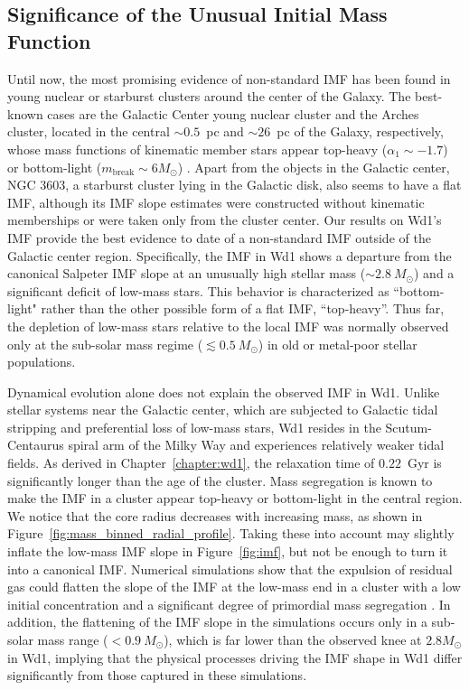\documentclass[12pt]{ucsddissertation}
\begin{document}
\begin{CJK*}{UTF8}{gbsn}
\section{Significance of the Unusual Initial Mass Function}
Until now, the most promising evidence of non-standard IMF has been found in young nuclear or starburst clusters around the center of the Galaxy. The best-known cases are the Galactic Center young nuclear cluster and the Arches cluster, located in the central $\sim0.5$~pc and $\sim26$~pc of the Galaxy, respectively, whose mass functions of kinematic member stars appear top-heavy ($\alpha_1\sim-1.7$) or bottom-light ($m_\mathrm{break}\sim6M_\odot$) \citep[][]{Hosek-2019}. 
Apart from the objects in the Galactic center, NGC 3603, a starburst cluster lying in the Galactic disk, also seems to have a flat IMF, although its IMF slope estimates were constructed without kinematic memberships or were taken only from the cluster center. Our results on Wd1's IMF provide the best evidence to date of a non-standard IMF outside of the Galactic center region. Specifically, the IMF in Wd1 shows a departure from the canonical Salpeter IMF slope at an unusually high stellar mass ($\sim 2.8~M_\odot$) and a significant deficit of low-mass stars. This behavior is characterized as ``bottom-light" rather than the other possible form of a flat IMF, ``top-heavy''. Thus far, the depletion of low-mass stars relative to the local IMF was normally observed only at the sub-solar mass regime ($\lesssim 0.5~M_\odot$) in old or metal-poor stellar populations. 


Dynamical evolution alone does not explain the observed IMF in Wd1. Unlike stellar systems near the Galactic center, which are subjected to Galactic tidal stripping and preferential loss of low-mass stars, Wd1 resides in the Scutum-Centaurus spiral arm of the Milky Way and experiences relatively weaker tidal fields. As derived in Chapter~\ref{chapter:wd1}, the relaxation time of $0.22$~Gyr is significantly longer than the age of the cluster. Mass segregation is known to make the IMF in a cluster appear top-heavy or bottom-light in the central region. We notice that the core radius decreases with increasing mass, as shown in Figure~\ref{fig:mass_binned_radial_profile}. Taking these into account may slightly inflate the low-mass IMF slope in Figure~\ref{fig:imf}, but not be enough to turn it into a canonical IMF.  Numerical simulations show that the expulsion of residual gas could flatten the slope of the IMF at the low-mass end in a cluster with a low initial concentration and a significant degree of primordial mass segregation \citep[][]{Haghi-2015}. In addition, the flattening of the IMF slope in the simulations occurs only in a sub-solar mass range ($ < 0.9~M_\odot$), which is far lower than the observed knee at $2.8M_\odot$ in Wd1, implying that the physical processes driving the IMF shape in Wd1 differ significantly from those captured in these simulations.



\end{CJK*}
\end{document}
